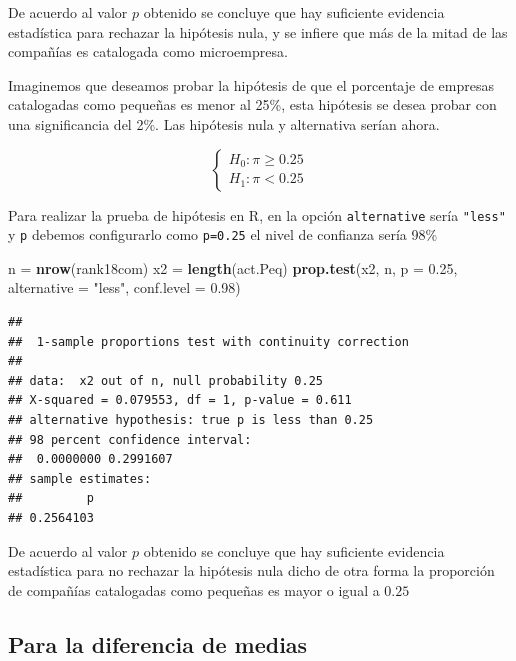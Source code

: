 \documentclass[
]{krantz}
\makeatletter
\newenvironment{Shaded}{\begin{snugshade}}{\end{snugshade}}
\newcommand{\DataTypeTok}[1]{\textcolor[rgb]{0.27,0.27,0.27}{#1}}
\newcommand{\FloatTok}[1]{\textcolor[rgb]{0.06,0.06,0.06}{#1}}
\newcommand{\KeywordTok}[1]{\textcolor[rgb]{0.27,0.27,0.27}{\textbf{#1}}}
\newcommand{\NormalTok}[1]{#1}
\newcommand{\StringTok}[1]{\textcolor[rgb]{0.5,0.5,0.5}{#1}}
\newenvironment{kframe}{%
\medskip{}
\setlength{\fboxsep}{.8em}
 \def\at@end@of@kframe{}%
 \ifinner\ifhmode%
  \def\at@end@of@kframe{\end{minipage}}%
  \begin{minipage}{\columnwidth}%
 \fi\fi%
 \def\FrameCommand##1{\hskip\@totalleftmargin \hskip-\fboxsep
 \colorbox{shadecolor}{##1}\hskip-\fboxsep
     \hskip-\linewidth \hskip-\@totalleftmargin \hskip\columnwidth}%
 \MakeFramed {\advance\hsize-\width
   \@totalleftmargin\z@ \linewidth\hsize
   \@setminipage}}%
 {\par\unskip\endMakeFramed%
 \at@end@of@kframe}
\renewenvironment{Shaded}{\begin{kframe}}{\end{kframe}}
\makeatother
\begin{document}
De acuerdo al valor \(p\) obtenido se concluye que hay suficiente evidencia estadística para rechazar la hipótesis nula, y se infiere que más de la mitad de las compañías es catalogada como microempresa.

Imaginemos que deseamos probar la hipótesis de que el porcentaje de empresas catalogadas como pequeñas es menor al 25\%, esta hipótesis se desea probar con una significancia del 2\%. Las hipótesis nula y alternativa serían ahora.

\begin{equation} 
\begin{cases} 
H_0: \pi \geq 0.25 \\ 
H_1: \pi < 0.25
\end{cases} 
\end{equation}

Para realizar la prueba de hipótesis en R, en la opción \texttt{alternative} sería \texttt{"less"} y \texttt{p} debemos configurarlo como \texttt{p=0.25} el nivel de confianza sería 98\%

\begin{Shaded}
\begin{Highlighting}[]
\NormalTok{n =}\StringTok{ }\KeywordTok{nrow}\NormalTok{(rank18com)}
\NormalTok{x2 =}\StringTok{ }\KeywordTok{length}\NormalTok{(act.Peq)}
\KeywordTok{prop.test}\NormalTok{(x2, n, }\DataTypeTok{p =} \FloatTok{0.25}\NormalTok{, }\DataTypeTok{alternative =} \StringTok{"less"}\NormalTok{,  }\DataTypeTok{conf.level =} \FloatTok{0.98}\NormalTok{)}
\end{Highlighting}
\end{Shaded}

\begin{verbatim}
## 
##  1-sample proportions test with continuity correction
## 
## data:  x2 out of n, null probability 0.25
## X-squared = 0.079553, df = 1, p-value = 0.611
## alternative hypothesis: true p is less than 0.25
## 98 percent confidence interval:
##  0.0000000 0.2991607
## sample estimates:
##         p 
## 0.2564103
\end{verbatim}

De acuerdo al valor \(p\) obtenido se concluye que hay suficiente evidencia estadística para no rechazar la hipótesis nula dicho de otra forma la proporción de compañías catalogadas como pequeñas es mayor o igual a \(0.25\)

\hypertarget{para-la-diferencia-de-medias}{%
\subsection{Para la diferencia de medias}\label{para-la-diferencia-de-medias}}
\end{document}
